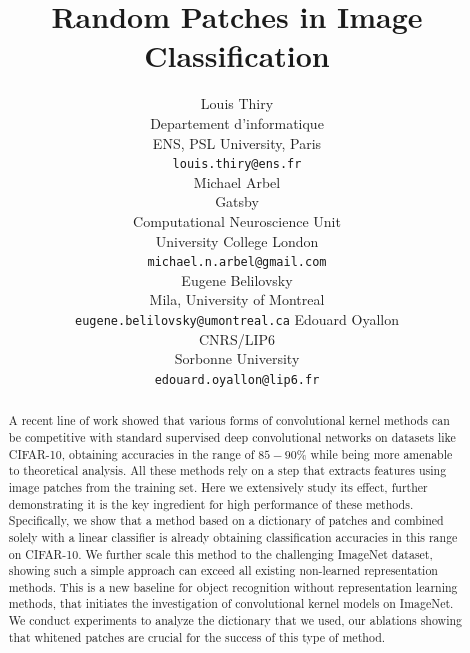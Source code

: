 \documentclass{article}
\title{Random Patches in Image Classification}
\author{%
  Louis Thiry \\
  Departement d'informatique \\
  ENS, PSL University, Paris\\
  \texttt{louis.thiry@ens.fr} \\
  \And
  Michael Arbel\\
  Gatsby\\
  Computational Neuroscience Unit\\
  University College London\\
  \texttt{michael.n.arbel@gmail.com}\\
  \And
    Eugene Belilovsky\\
  Mila, University of Montreal\\
  \texttt{eugene.belilovsky@umontreal.ca}
  \And
  Edouard Oyallon \\
  CNRS/LIP6 \\
  Sorbonne University \\
  \texttt{edouard.oyallon@lip6.fr} \\
}
\begin{document}
\maketitle

\begin{abstract}
A recent line of work showed that  various forms of convolutional  kernel methods can be competitive with standard supervised deep convolutional networks on datasets like CIFAR-10, obtaining accuracies in the range of $85-90\%$ while being more amenable to theoretical analysis. All these methods rely on a step that extracts features using image patches from the training set. Here we extensively study its effect, further demonstrating it is the key ingredient for high performance of these methods. Specifically, we show that a method based on a dictionary of patches and combined solely with a linear classifier is already obtaining classification accuracies in this range on CIFAR-10. We further scale this method to the challenging ImageNet dataset, showing such a simple approach can exceed all existing non-learned representation methods. This is a new baseline for object recognition without representation learning methods, that  initiates the investigation of  convolutional kernel models  on ImageNet. We conduct experiments to analyze the dictionary that we used, our ablations showing that whitened patches are crucial for the success of this  type of method. 

 
\end{abstract}
\end{document}
